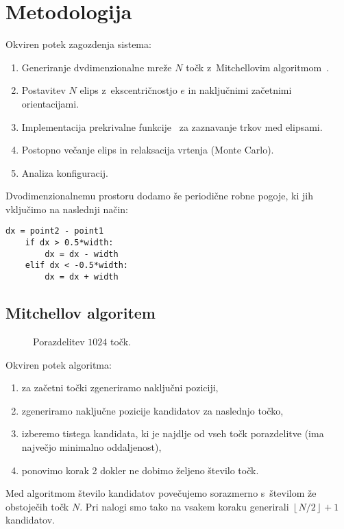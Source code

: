 \lstset{language=Python}

\chapter{Metodologija}
\label{chMe}

Okviren potek zagozdenja sistema:
\begin{enumerate}
\item{Generiranje dvdimenzionalne mreže $N$ točk z~Mitchellovim algoritmom~\cite{mitch}}.
\item{Postavitev $N$ elips z~ekscentričnostjo $e$ in naključnimi začetnimi orientacijami.}
\item{Implementacija prekrivalne funkcije~\cite{perram1985} za zaznavanje trkov med elipsami.}
\item{Postopno večanje elips in relaksacija vrtenja (Monte Carlo).}
\item{Analiza konfiguracij.}
\end{enumerate}
Dvodimenzionalnemu prostoru dodamo še periodične robne pogoje, ki jih vključimo na naslednji 
način:
\begin{lstlisting}[frame=single]  
    dx = point2 - point1
    if dx > 0.5*width:
        dx = dx - width
    elif dx < -0.5*width:
        dx = dx + width
\end{lstlisting}

\section{Mitchellov algoritem}

\begin{figure}[h!]
    \centering
    
    \caption[Blue noise]{Porazdelitev $1024$ točk.}
    \label{slika1}
\end{figure}

Okviren potek algoritma:
\begin{enumerate}
    \item{za začetni točki zgeneriramo naključni poziciji,}
    \item{zgeneriramo naključne pozicije kandidatov za naslednjo točko,}
    \item{izberemo tistega kandidata, ki je najdlje od vseh točk porazdelitve 
    (ima največjo minimalno oddaljenost),}
    \item{ponovimo korak 2 dokler ne dobimo željeno število točk.}
\end{enumerate}
Med algoritmom število kandidatov povečujemo sorazmerno s~številom že obstoječih
točk $N$. Pri nalogi smo tako na vsakem koraku generirali 
$ \left \lfloor{N/2}\right \rfloor + 1$ kandidatov.\\

